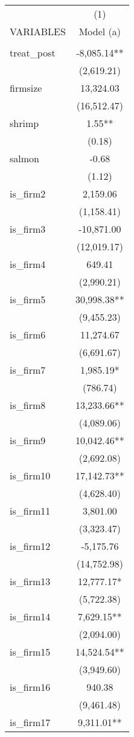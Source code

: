 \begin{tabular}{lc} \hline
 & (1) \\
VARIABLES & Model (a) \\ \hline
 &  \\
treat\_post & -8,085.14** \\
 & (2,619.21) \\
firmsize & 13,324.03 \\
 & (16,512.47) \\
shrimp & 1.55** \\
 & (0.18) \\
salmon & -0.68 \\
 & (1.12) \\
is\_firm2 & 2,159.06 \\
 & (1,158.41) \\
is\_firm3 & -10,871.00 \\
 & (12,019.17) \\
is\_firm4 & 649.41 \\
 & (2,990.21) \\
is\_firm5 & 30,998.38** \\
 & (9,455.23) \\
is\_firm6 & 11,274.67 \\
 & (6,691.67) \\
is\_firm7 & 1,985.19* \\
 & (786.74) \\
is\_firm8 & 13,233.66** \\
 & (4,089.06) \\
is\_firm9 & 10,042.46** \\
 & (2,692.08) \\
is\_firm10 & 17,142.73** \\
 & (4,628.40) \\
is\_firm11 & 3,801.00 \\
 & (3,323.47) \\
is\_firm12 & -5,175.76 \\
 & (14,752.98) \\
is\_firm13 & 12,777.17* \\
 & (5,722.38) \\
is\_firm14 & 7,629.15** \\
 & (2,094.00) \\
is\_firm15 & 14,524.54** \\
 & (3,949.60) \\
is\_firm16 & 940.38 \\
 & (9,461.48) \\
is\_firm17 & 9,311.01** \\

\end{tabular}
